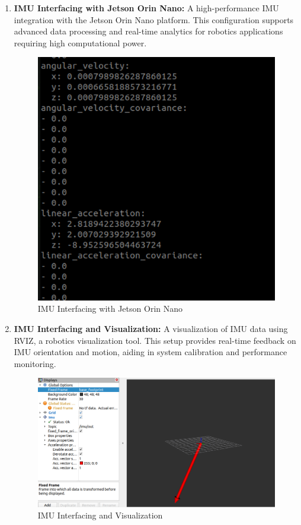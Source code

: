 {\begin{enumerate}[label=\textbf{\arabic*}., leftmargin=*]
		\item \textbf{IMU Interfacing with Jetson Orin Nano:} A high-performance IMU integration with the Jetson Orin Nano platform. This configuration supports advanced data processing and real-time analytics for robotics applications requiring high computational power.
		
		\begin{figure}[H]
			\centering
			\includegraphics[scale=0.5]{images/Content/IMU_JETSON}
			\caption{IMU Interfacing with Jetson Orin Nano}
		\end{figure}
		
		\item \textbf{IMU Interfacing and Visualization:} A visualization of IMU data using RVIZ, a robotics visualization tool. This setup provides real-time feedback on IMU orientation and motion, aiding in system calibration and performance monitoring.
		
		\begin{figure}[H]
			\centering
			\includegraphics[scale=0.6]{images/Content/IMU_RVIZ}
			\caption{IMU Interfacing and Visualization}
		\end{figure}
		

\end{enumerate}}

